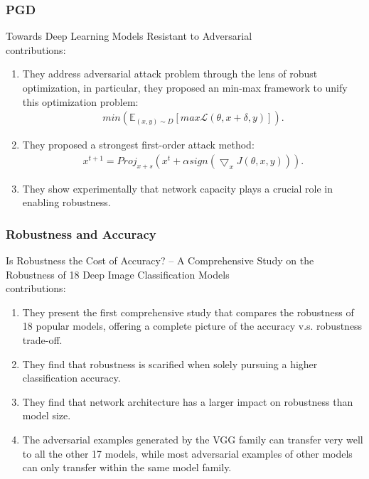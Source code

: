 \documentclass[10pt]{beamer}
\begin{document}
\subsubsection{PGD}
\begin{frame}
  Towards Deep Learning Models Resistant to Adversarial~\cite{pgd}\\
  contributions:
  \begin{enumerate}
    \item They address adversarial attack problem through the lens of robust optimization, in particular, they proposed an min-max framework to unify this optimization problem:
    \begin{align}
      min (\mathbb{E}_{(x,y)\sim D} [max \mathcal{L} (\theta, x+\delta, y)] ).
    \end{align}
    \item They proposed a strongest first-order attack method:
    \begin{align}
      x^{t+1} = Proj_{x+s} (x^t + \alpha sign(\bigtriangledown_{x}J(\theta, x, y))).
    \end{align}
    \item They show experimentally that network capacity plays a crucial role in enabling
    robustness.
  \end{enumerate}
\end{frame}

\subsubsection{Robustness and Accuracy}
\begin{frame}
  Is Robustness the Cost of Accuracy? – A Comprehensive Study on the Robustness of 18 Deep Image Classification Models~\cite{raa}\\
  contributions:
  \begin{enumerate}
    \item They present the first comprehensive study that compares the robustness of
    18 popular models, offering a complete picture of the accuracy v.s. robustness trade-off.
    \item They find that robustness is scarified when solely pursuing a higher classification accuracy.
    \item They find that network architecture has a larger impact on robustness than model size.
    \item The adversarial examples generated by the VGG family can transfer very well
    to all the other 17 models, while most adversarial examples of other models can
    only transfer within the same model family.
  \end{enumerate}
\end{frame}
\end{document}

